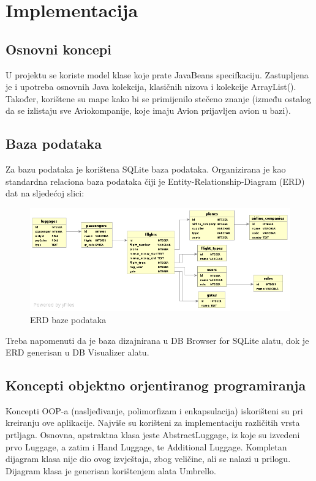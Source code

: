 \chapter{Implementacija}

\section{Osnovni koncepi}

U projektu se koriste model klase koje prate JavaBeans specifkaciju. Zastupljena je i upotreba osnovnih Java kolekcija, klasičnih nizova i kolekcije ArrayList(). Također, korištene su mape kako bi se primijenilo stečeno znanje (između ostalog da se izlistaju sve Aviokompanije, koje imaju Avion prijavljen avion u bazi). 

\section{Baza podataka}

Za bazu podataka je korištena SQLite baza podataka. Organizirana je kao standardna relaciona baza podataka čiji je Entity-Relationship-Diagram (ERD) dat na sljedećoj slici:
\begin{figure}[h]
	\centering
	\includegraphics[width=0.9\linewidth]{Slike/ERD}
	\caption{ERD baze podataka}
	\label{fig:erd}
\end{figure}

Treba napomenuti da je baza dizajnirana u DB Browser for SQLite alatu, dok je ERD generisan u DB Visualizer alatu.


\section{Koncepti objektno orjentiranog programiranja}

Koncepti OOP-a (nasljeđivanje, polimorfizam i enkapsulacija) iskorišteni su pri kreiranju ove aplikacije. Najviše su korišteni za implementaciju različitih vrsta prtljaga. Osnovna, apstraktna klasa jeste AbstractLuggage, iz koje su izvedeni prvo Luggage, a zatim i Hand Luggage, te Additional Luggage. Kompletan dijagram klasa nije dio ovog izvještaja, zbog veličine, ali se nalazi u prilogu. Dijagram klasa je generisan korištenjem alata Umbrello.


